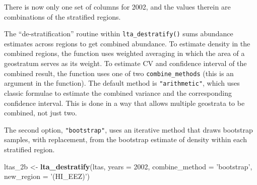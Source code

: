 \documentclass[
]{book}
\newenvironment{Shaded}{\begin{snugshade}}{\end{snugshade}}
\newcommand{\DataTypeTok}[1]{\textcolor[rgb]{0.13,0.29,0.53}{#1}}
\newcommand{\DecValTok}[1]{\textcolor[rgb]{0.00,0.00,0.81}{#1}}
\newcommand{\FloatTok}[1]{\textcolor[rgb]{0.00,0.00,0.81}{#1}}
\newcommand{\KeywordTok}[1]{\textcolor[rgb]{0.13,0.29,0.53}{\textbf{#1}}}
\newcommand{\NormalTok}[1]{#1}
\newcommand{\OperatorTok}[1]{\textcolor[rgb]{0.81,0.36,0.00}{\textbf{#1}}}
\newcommand{\OtherTok}[1]{\textcolor[rgb]{0.56,0.35,0.01}{#1}}
\newcommand{\StringTok}[1]{\textcolor[rgb]{0.31,0.60,0.02}{#1}}
\begin{document}
\begin{Shaded}
\end{Shaded}

There is now only one set of columns for 2002, and the values therein are combinations of the stratified regions.

The ``de-stratification'' routine within \texttt{lta\_destratify()} sums abundance estimates across regions to get combined abundance. To estimate density in the combined regions, the function uses weighted averaging in which the area of a geostratum serves as its weight. To estimate CV and confidence interval of the combined result, the function uses one of two \texttt{combine\_methods} (this is an argument in the function). The default method is \texttt{"arithmetic"}, which uses classic formulae to estimate the combined variance and the corresponding confidence interval. This is done in a way that allows multiple geostrata to be combined, not just two.

The second option, \texttt{"bootstrap"}, uses an iterative method that draws bootstrap samples, with replacement, from the bootstrap estimate of density within each stratified region.

\begin{Shaded}
\begin{Highlighting}[]
\NormalTok{ltas_2b <-}
\StringTok{  }\KeywordTok{lta_destratify}\NormalTok{(ltas,}
               \DataTypeTok{years =} \DecValTok{2002}\NormalTok{,}
               \DataTypeTok{combine_method =} \StringTok{'bootstrap'}\NormalTok{,}
               \DataTypeTok{new_region =} \StringTok{'(HI_EEZ)'}\NormalTok{)}
\end{Highlighting}
\end{Shaded}
\end{document}
